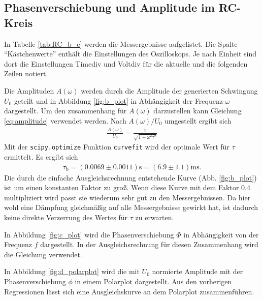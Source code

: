 \subsection{Phasenverschiebung und Amplitude im RC-Kreis}
In Tabelle \ref{tab:RC_b_c} werden die Messergebnisse aufgelistet. 
Die Spalte \enquote{Kästchenwerte} enthält die Einstellungen des Oszilloskops.
Je nach Einheit sind dort die Einstellungen Timediv und Voltdiv für die aktuelle und die folgenden Zeilen notiert.
%

%
Die Amplituden $A(\omega)$ werden durch die Amplitude der generierten Schwingung $U_0$ geteilt und in Abbildung \ref{fig:b_plot}
in Abhängigkeit der Frequenz $\omega$ dargestellt.
Um den zusammenhang für $A(\omega)$ darzustellen kann Gleichung \ref{eq:amplitude} verwendet werden.
Nach $A(\omega) / U_0$ umgestellt ergibt sich
\begin{align*}
    \frac{A(\omega)}{U_0} = \frac{1}{\sqrt{1 + \omega^2  \tau^2}}
\end{align*}
Mit der \texttt{scipy.optimize} Funktion \texttt{curvefit} \cite{scipy} wird der optimale Wert für $\tau$ ermittelt.
Es ergibt sich 
\begin{align}
    \tau_\text{b} = (\num{0.0069}\pm \num{0.0011})\unit{\s} =(\num{6.9}\pm \num{1.1})\unit{\milli\s}.
    \label{eq:tau_b}
\end{align}
Die durch die einfache Ausgleichsrechnung entstehende Kurve (Abb. \ref{fig:b_plot}) ist um einen konstanten Faktor zu groß.
Wenn diese Kurve mit dem Faktor \num{0.4} multipliziert wird passt sie wiederum sehr gut zu den Messergebnissen.
Da hier wohl eine Dämpfung gleichmäßig auf alle Messergebnisse gewirkt hat,
ist dadurch keine direkte Verzerrung des Wertes für $\tau$ zu erwarten.
%


In Abbildung \ref{fig:c_plot} wird die Phasenverschiebung $\Phi$ in Abhängigkeit von der Frequenz $f$ dargestellt.
In der Ausgleichsrechnung für diesen Zusammenhang wird die Gleichung  verwendet.

% 


In Abbildung \ref{fig:d_polarplot} wird die mit $U_0$ normierte Amplitude mit der Phasenverschiebung $\phi$ in einem Polarplot dargestellt.
Aus den vorherigen Regressionen lässt sich eine Ausgleichskurve an dem Polarplot zusammenführen.




